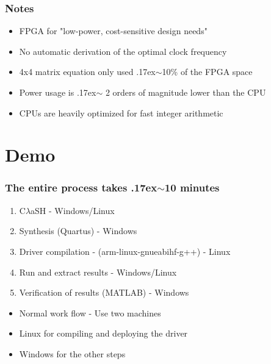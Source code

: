 \documentclass{beamer}[10]
\newcommand{\clash}{C$\lambda$aSH}
\newcommand{\matlab}{MATLAB}
\newcommand{\mytilde}{{\raise.17ex\hbox{$\scriptstyle\sim$}}}
\begin{document}
\begin{frame}
	\frametitle{Notes}
	\begin{itemize}
		\item FPGA for "low-power, cost-sensitive design needs"
		\item No automatic derivation of the optimal clock frequency
		\item 4x4 matrix equation only used \mytilde{}10\% of the FPGA space
		\item Power usage is \mytilde{} 2 orders of magnitude lower than the CPU
		\item CPUs are heavily optimized for fast integer arithmetic
	\end{itemize}
\end{frame}

\section{Demo}
\begin{frame}
	\frametitle{The entire process takes \mytilde{}10 minutes}
	\begin{enumerate}
		\item \clash{} - Windows/Linux
		\item Synthesis (Quartus) - Windows
		\item Driver compilation - (arm-linux-gnueabihf-g++) - Linux
		\item Run and extract results - Windows/Linux
		\item Verification of results (\matlab{}) - Windows
	\end{enumerate}
	
	\begin{itemize}
		\item Normal work flow - Use two machines
		\item Linux for compiling and deploying the driver
		\item Windows for the other steps
	\end{itemize}
\end{frame}
\end{document}
